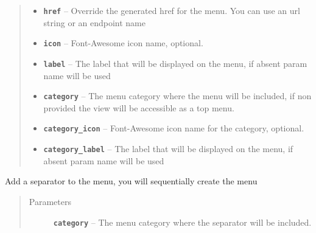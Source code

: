 \documentclass[letterpaper,10pt,english]{sphinxmanual}
\begin{document}
\begin{fulllineitems}
\begin{fulllineitems}
\begin{quote}
\begin{description}
\begin{itemize}
\item {} 
\textbf{\texttt{href}} -- Override the generated href for the menu.
You can use an url string or an endpoint name

\item {} 
\textbf{\texttt{icon}} -- Font-Awesome icon name, optional.

\item {} 
\textbf{\texttt{label}} -- The label that will be displayed on the menu,
if absent param name will be used

\item {} 
\textbf{\texttt{category}} -- The menu category where the menu will be included,
if non provided the view will be accessible as a top menu.

\item {} 
\textbf{\texttt{category\_icon}} -- Font-Awesome icon name for the category, optional.

\item {} 
\textbf{\texttt{category\_label}} -- The label that will be displayed on the menu,
if absent param name will be used

\end{itemize}

\end{description}\end{quote}

\end{fulllineitems}


\begin{fulllineitems}
\label{api:flask.ext.appbuilder.base.AppBuilder.add_separator}
Add a separator to the menu, you will sequentially create the menu
\begin{quote}\begin{description}
\item[{Parameters}] \leavevmode
\textbf{\texttt{category}} -- The menu category where the separator will be included.

\end{description}\end{quote}

\end{fulllineitems}



\end{fulllineitems}
\end{document}

